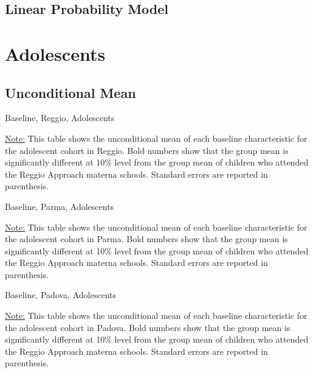 \documentclass[12pt]{article}
\begin{document}
\subsection{Linear Probability Model}





\section{Adolescents}
\subsection{Unconditional Mean}
\begin{table}[H]
\caption{Baseline, Reggio, Adolescents} \label{tab:base-reggio-adol}
\scalebox{0.85}{

}
\begin{footnotesize}
\vspace{0.5mm} 

\underline{Note:} This table shows the unconditional mean of each baseline characteristic for the adolescent cohort in Reggio. Bold numbers show that the group mean is significantly different at 10\% level from the group mean of children who attended the Reggio Approach materna schools. Standard errors are reported in parenthesis. 
\end{footnotesize}
\end{table}

\begin{table}[H]
\caption{Baseline, Parma, Adolescents} \label{tab:base-parma-adol}
\scalebox{0.85}{

}
\begin{footnotesize}
\vspace{0.5mm} 

\underline{Note:} This table shows the unconditional mean of each baseline characteristic for the adolescent cohort in Parma. Bold numbers show that the group mean is significantly different at 10\% level from the group mean of children who attended the Reggio Approach materna schools. Standard errors are reported in parenthesis. 
\end{footnotesize}
\end{table}

\begin{table}[H]
\caption{Baseline, Padova, Adolescents} \label{tab:base-padova-adol}
\scalebox{0.85}{

}
\begin{footnotesize}
\vspace{0.5mm} 

\underline{Note:} This table shows the unconditional mean of each baseline characteristic for the adolescent cohort in Padova. Bold numbers show that the group mean is significantly different at 10\% level from the group mean of children who attended the Reggio Approach materna schools. Standard errors are reported in parenthesis. 
\end{footnotesize}
\end{table}
\end{document}
